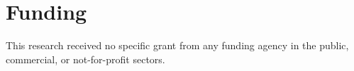 \documentclass[sn-mathphys-num, Numbered]{sn-jnl}%
\theoremstyle{thmstyleone}%
\theoremstyle{thmstyletwo}%
\theoremstyle{thmstylethree}%
\begin{document}
\section*{Funding}
This research received no specific grant from any funding agency in the public, commercial, or not-for-profit sectors.




%
\end{document}
